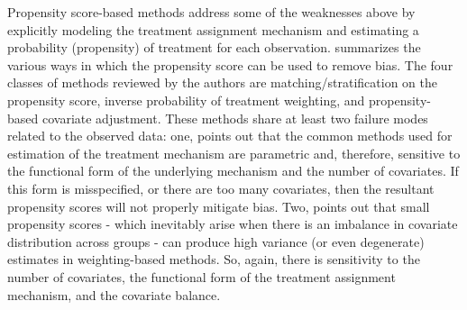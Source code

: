 \documentclass[../main.tex]{subfiles}
\begin{document}
\vspace{\baselineskip}
Propensity score-based methods address some of the weaknesses above by explicitly modeling the treatment assignment mechanism and estimating a probability (propensity) of treatment for each observation. \textcite{Austin2011AnStudies} summarizes the various ways in which the propensity score can be used to remove bias. The four classes of methods reviewed by the authors are matching/stratification on the propensity score, inverse probability of treatment weighting, and propensity-based covariate adjustment. These methods share at least two failure modes related to the observed data: one, \textcite{Hill2011BayesianInference} points out that the common methods used for estimation of the treatment mechanism are parametric and, therefore, sensitive to the functional form of the underlying mechanism and the number of covariates. If this form is misspecified, or there are too many covariates, then the resultant propensity scores will not properly mitigate bias. Two, \textcite{Knaus2018MachineEvidence} points out that small propensity scores - which inevitably arise when there is an imbalance in covariate distribution across groups - can produce high variance (or even degenerate) estimates in weighting-based methods. So, again, there is sensitivity to the number of covariates, the functional form of the treatment assignment mechanism, and the covariate balance.\par
\end{document}

